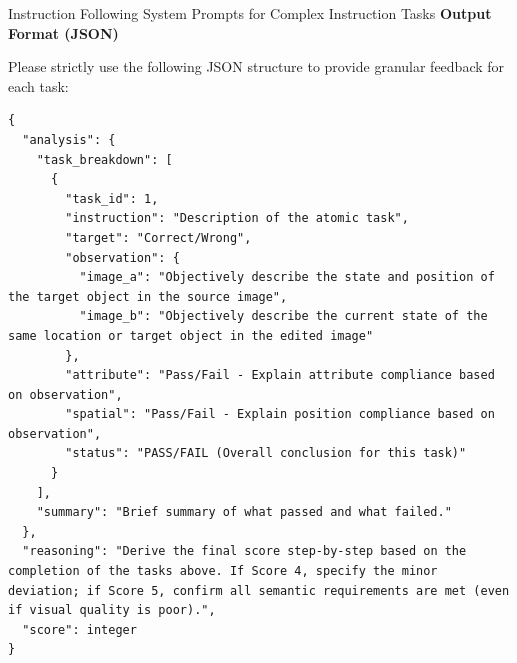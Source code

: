 \documentclass{llmxive}
\begin{document}
\begin{promptbox}[label={System Prompts: IF_Complex_Instruction}]{Instruction Following System Prompts for Complex Instruction Tasks}
\textbf{Output Format (JSON)}

Please strictly use the following JSON structure to provide granular feedback for each task:

\begin{lstlisting}
{
  "analysis": {
    "task_breakdown": [
      {
        "task_id": 1,
        "instruction": "Description of the atomic task",
        "target": "Correct/Wrong",
        "observation": {
          "image_a": "Objectively describe the state and position of the target object in the source image",
          "image_b": "Objectively describe the current state of the same location or target object in the edited image"
        },
        "attribute": "Pass/Fail - Explain attribute compliance based on observation",
        "spatial": "Pass/Fail - Explain position compliance based on observation",
        "status": "PASS/FAIL (Overall conclusion for this task)"
      }
    ],
    "summary": "Brief summary of what passed and what failed."
  },
  "reasoning": "Derive the final score step-by-step based on the completion of the tasks above. If Score 4, specify the minor deviation; if Score 5, confirm all semantic requirements are met (even if visual quality is poor).",
  "score": integer
}
\end{lstlisting}


\end{promptbox}
\end{document}
